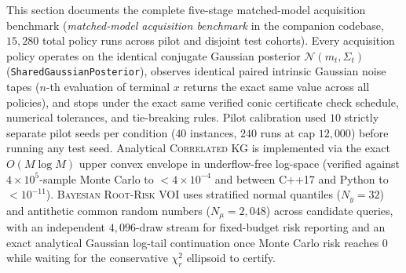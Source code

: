 \documentclass{article}
\theoremstyle{plain}
\theoremstyle{definition}
\begin{document}
This section documents the complete five-stage matched-model acquisition benchmark (\emph{matched-model acquisition benchmark} in the companion codebase, $15{,}280$ total policy runs across pilot and disjoint test cohorts). Every acquisition policy operates on the identical conjugate Gaussian posterior $\mathcal N(m_t,\Sigma_t)$ (\texttt{SharedGaussianPosterior}), observes identical paired intrinsic Gaussian noise tapes ($n$-th evaluation of terminal $x$ returns the exact same value across all policies), and stops under the exact same verified conic certificate check schedule, numerical tolerances, and tie-breaking rules. Pilot calibration used $10$ strictly separate pilot seeds per condition ($40$ instances, $240$ runs at cap $12{,}000$) before running any test seed. Analytical \textsc{Correlated KG} \citep{frazier2009kg} is implemented via the exact $O(M\log M)$ upper convex envelope in underflow-free log-space (verified against $4\times 10^5$-sample Monte Carlo to $<4\times 10^{-4}$ and between C++17 and Python to $<10^{-11}$). \textsc{Bayesian Root-Risk VOI} uses stratified normal quantiles ($N_y=32$) and antithetic common random numbers ($N_\mu=2{,}048$) across candidate queries, with an independent $4{,}096$-draw stream for fixed-budget risk reporting and an exact analytical Gaussian log-tail continuation once Monte Carlo risk reaches $0$ while waiting for the conservative $\chi^2_r$ ellipsoid to certify.
\end{document}
